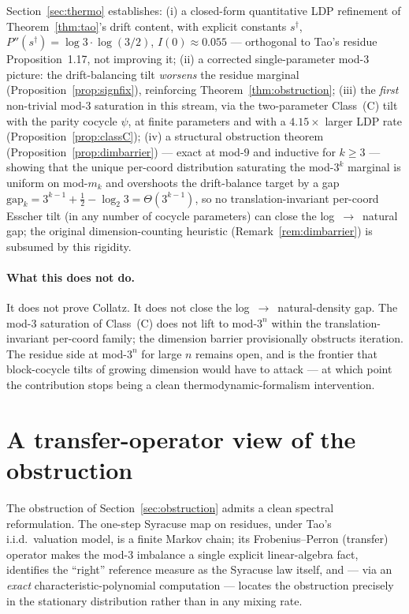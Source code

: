 \documentclass[11pt]{amsart}
\theoremstyle{definition}
\theoremstyle{remark}
\begin{document}
Section~\ref{sec:thermo} establishes:
(i) a closed-form quantitative LDP refinement of Theorem~\ref{thm:tao}'s drift content, with explicit
constants $s^\dagger$, $P''(s^\dagger)=\log 3\cdot\log(3/2)$, $I(0)\approx 0.055$ --- orthogonal to
Tao's residue Proposition~1.17, not improving it;
(ii) a corrected single-parameter mod-$3$ picture: the drift-balancing tilt \emph{worsens} the
residue marginal (Proposition~\ref{prop:signfix}), reinforcing Theorem~\ref{thm:obstruction};
(iii) the \emph{first} non-trivial mod-$3$ saturation in this stream, via the two-parameter
Class~(C) tilt with the parity cocycle $\psi$, at finite parameters and with a $4.15\times$ larger LDP
rate (Proposition~\ref{prop:classC});
(iv) a structural obstruction theorem (Proposition~\ref{prop:dimbarrier}) --- exact at mod-$9$ and
inductive for $k\ge3$ --- showing that the unique per-coord distribution saturating the mod-$3^k$
marginal is uniform on mod-$m_k$ and overshoots the drift-balance target by a gap
$\mathrm{gap}_k=3^{k-1}+\tfrac12-\log_2 3=\Theta(3^{k-1})$, so no translation-invariant per-coord
Esscher tilt (in any number of cocycle parameters) can close the log~$\to$~natural gap; the original
dimension-counting heuristic (Remark~\ref{rem:dimbarrier}) is subsumed by this rigidity.

\paragraph{What this does not do.}
It does not prove Collatz. It does not close the log~$\to$~natural-density gap. The mod-$3$
saturation of Class~(C) does not lift to mod-$3^n$ within the translation-invariant per-coord
family; the dimension barrier provisionally obstructs iteration. The residue side at mod-$3^n$ for
large $n$ remains open, and is the frontier that block-cocycle tilts of growing dimension would
have to attack --- at which point the contribution stops being a clean thermodynamic-formalism
intervention.

\section{A transfer-operator view of the obstruction}
\label{sec:transfer}

The obstruction of Section~\ref{sec:obstruction} admits a clean spectral reformulation. The
one-step Syracuse map on residues, under Tao's i.i.d.\ valuation model, is a finite Markov chain;
its Frobenius--Perron (transfer) operator makes the mod-$3$ imbalance a single explicit
linear-algebra fact, identifies the ``right'' reference measure as the Syracuse law itself, and ---
via an \emph{exact} characteristic-polynomial computation --- locates the obstruction precisely in
the stationary distribution rather than in any mixing rate.
\end{document}
